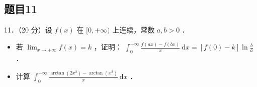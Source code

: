 \documentclass{article}
\begin{document}
\subsection{题目11}
11．（20 分）设 \(f(x)\) 在 \([0,+\infty)\) 上连续，常数 \(a, b>0\) ．

\begin{itemize}
  \item[（1）] 若 \(\lim _{x \rightarrow+\infty} f(x)=k\) ，证明： \(\int_{0}^{+\infty} \frac{f(a x)-f(b x)}{x} \mathrm{~d} x=[f(0)-k] \ln \frac{b}{a}\) ．
  \item[（2）] 计算 \(\int_{0}^{+\infty} \frac{\arctan \left(2 x^{2}\right)-\arctan \left(x^{2}\right)}{x} \mathrm{~d} x\) ．
\end{itemize}
\end{document}
